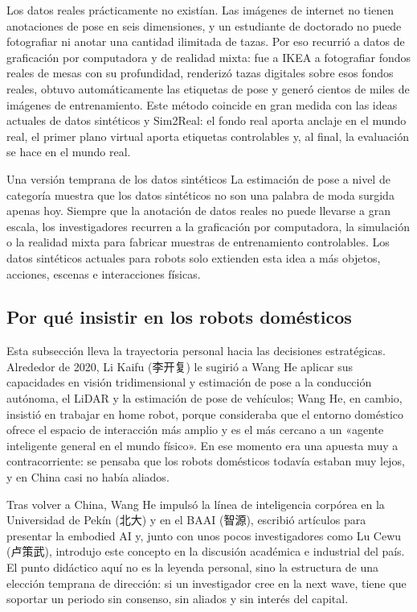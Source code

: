 \documentclass[a4paper]{article}
\begin{document}
Los datos reales prácticamente no existían. Las imágenes de internet no tienen anotaciones de pose en seis dimensiones, y un estudiante de doctorado no puede fotografiar ni anotar una cantidad ilimitada de tazas. Por eso recurrió a datos de graficación por computadora y de realidad mixta: fue a IKEA a fotografiar fondos reales de mesas con su profundidad, renderizó tazas digitales sobre esos fondos reales, obtuvo automáticamente las etiquetas de pose y generó cientos de miles de imágenes de entrenamiento. Este método coincide en gran medida con las ideas actuales de datos sintéticos y Sim2Real: el fondo real aporta anclaje en el mundo real, el primer plano virtual aporta etiquetas controlables y, al final, la evaluación se hace en el mundo real.

\begin{importantbox}{Una versión temprana de los datos sintéticos}
La estimación de pose a nivel de categoría muestra que los datos sintéticos no son una palabra de moda surgida apenas hoy. Siempre que la anotación de datos reales no puede llevarse a gran escala, los investigadores recurren a la graficación por computadora, la simulación o la realidad mixta para fabricar muestras de entrenamiento controlables. Los datos sintéticos actuales para robots solo extienden esta idea a más objetos, acciones, escenas e interacciones físicas.
\end{importantbox}

\subsection{Por qué insistir en los robots domésticos}

Esta subsección lleva la trayectoria personal hacia las decisiones estratégicas. Alrededor de 2020, Li Kaifu (李开复) le sugirió a Wang He aplicar sus capacidades en visión tridimensional y estimación de pose a la conducción autónoma, el LiDAR y la estimación de pose de vehículos; Wang He, en cambio, insistió en trabajar en home robot, porque consideraba que el entorno doméstico ofrece el espacio de interacción más amplio y es el más cercano a un «agente inteligente general en el mundo físico». En ese momento era una apuesta muy a contracorriente: se pensaba que los robots domésticos todavía estaban muy lejos, y en China casi no había aliados.

Tras volver a China, Wang He impulsó la línea de inteligencia corpórea en la Universidad de Pekín (北大) y en el BAAI (智源), escribió artículos para presentar la embodied AI y, junto con unos pocos investigadores como Lu Cewu (卢策武), introdujo este concepto en la discusión académica e industrial del país. El punto didáctico aquí no es la leyenda personal, sino la estructura de una elección temprana de dirección: si un investigador cree en la next wave, tiene que soportar un periodo sin consenso, sin aliados y sin interés del capital.
\end{document}
